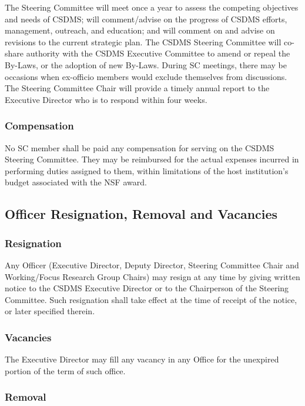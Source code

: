\documentclass[11pt, oneside]{article}   	%
\begin{document}
The Steering Committee will meet once a year to assess the competing objectives and needs of CSDMS; will comment/advise on the progress of CSDMS efforts, management, outreach, and education; and will comment on and advise on revisions to the current strategic plan. The CSDMS Steering Committee will co-share authority with the CSDMS Executive Committee to amend or repeal the By-Laws, or the adoption of new By-Laws. During SC meetings, there may be occasions when ex-officio members would exclude themselves from discussions. The Steering Committee Chair will provide a timely annual report to the Executive Director who is to respond within four weeks.
	
\subsubsection{Compensation}
	
No SC member shall be paid any compensation for serving on the CSDMS Steering Committee. They may be reimbursed for the actual expenses incurred in performing duties assigned to them, within limitations of the host institution's budget associated with the NSF award.
	
	
\subsection{Officer Resignation, Removal and Vacancies}
 
\subsubsection{Resignation}

Any Officer (Executive Director, Deputy Director, Steering Committee Chair and Working/Focus Research Group Chairs) may resign at any time by giving written notice to the CSDMS Executive Director or to the Chairperson of the Steering Committee. Such resignation shall take effect at the time of receipt of the notice, or later specified therein. 

\subsubsection{Vacancies}

The Executive Director may fill any vacancy in any Office for the unexpired portion of the term of such office. 

\subsubsection{Removal}
\end{document}
